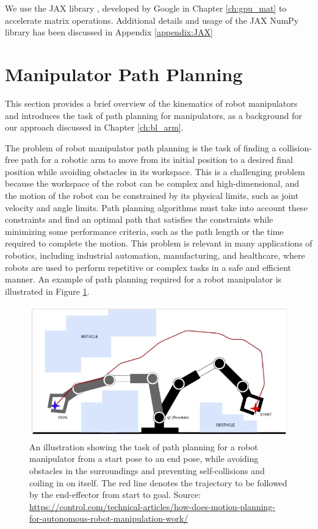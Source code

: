 We use the JAX library \cite{bradbury2020jax}, developed by Google in Chapter \ref{ch:gpu_mat} to accelerate matrix operations. Additional details and usage of the JAX NumPy library has been discussed in Appendix \ref{appendix:JAX}



\section{Manipulator Path Planning}

This section provides a brief overview of the kinematics of robot manipulators and introduces the task of path planning for manipulators, as a background for our approach discussed in Chapter \ref{ch:bl_arm}.

The problem of robot manipulator path planning is the task of finding a collision-free path for a robotic arm to move from its initial position to a desired final position while avoiding obstacles in its workspace. This is a challenging problem because the workspace of the robot can be complex and high-dimensional, and the motion of the robot can be constrained by its physical limits, such as joint velocity and angle limits. Path planning algorithms must take into account these constraints and find an optimal path that satisfies the constraints while minimizing some performance criteria, such as the path length or the time required to complete the motion. This problem is relevant in many applications of robotics, including industrial automation, manufacturing, and healthcare, where robots are used to perform repetitive or complex tasks in a safe and efficient manner. An example of path planning required for a robot manipulator is illustrated in Figure \ref{fig:manipulator-planning}.

\begin{figure}[ht]
    \centering
    \includegraphics[scale=0.5]{figures/background/manipulator_planning.png}
    \caption[Path Planning for a Manipulator]{An illustration showing the task of path planning for a robot manipulator from a start pose to an end pose, while avoiding obstacles in the surroundings and preventing self-collisions and coiling in on itself. The red line denotes the trajectory to be followed by the end-effector from start to goal. Source: \scriptsize{\url{https://control.com/technical-articles/how-does-motion-planning-for-autonomous-robot-manipulation-work/}}}
    \label{fig:manipulator-planning}
\end{figure}


